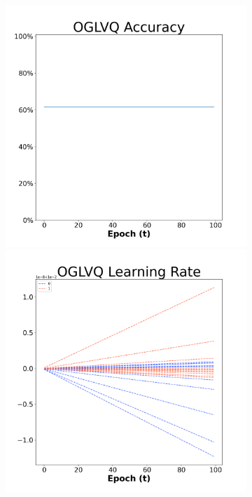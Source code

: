 \begin{figure}[H]
  \centering %
\begin{subfigure}{0.3\textwidth}
\includegraphics[width=\linewidth]{images/exper1/SP/OGLVQ_0.01_acc.png}
  \includegraphics[width=\linewidth]{images/exper1/SP/OGLVQ_0.01_lr.png}

\end{subfigure}
\end{figure}
